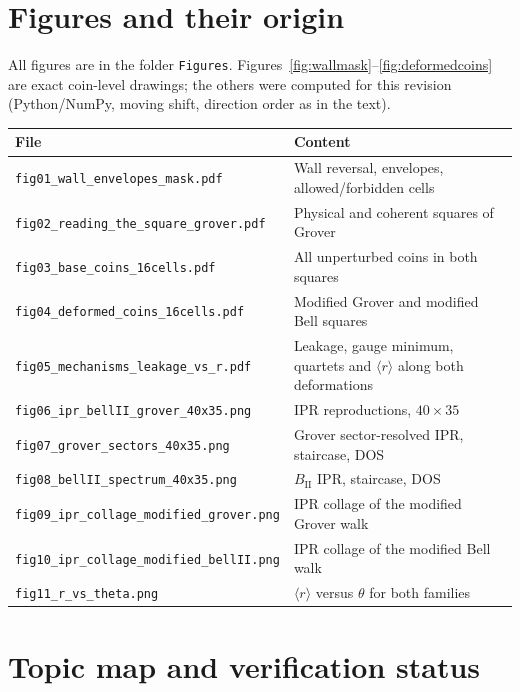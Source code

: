 \documentclass[11pt,a4paper,oneside]{report}
\numberwithin{equation}{chapter}
\begin{document}
\section{Figures and their origin}
All figures are in the folder \texttt{Figures}. Figures~\ref{fig:wallmask}--\ref{fig:deformedcoins}
are exact coin-level drawings; the others were computed for this revision (Python/NumPy,
moving shift, direction order as in the text).
\begin{center}\small
\begin{tabularx}{\textwidth}{@{}lY@{}}\toprule
File & Content\\\midrule
\texttt{fig01\_wall\_envelopes\_mask.pdf} & Wall reversal, envelopes, allowed/forbidden cells\\
\texttt{fig02\_reading\_the\_square\_grover.pdf} & Physical and coherent squares of Grover\\
\texttt{fig03\_base\_coins\_16cells.pdf} & All unperturbed coins in both squares\\
\texttt{fig04\_deformed\_coins\_16cells.pdf} & Modified Grover and modified Bell squares\\
\texttt{fig05\_mechanisms\_leakage\_vs\_r.pdf} & Leakage, gauge minimum, quartets and \(\langle r\rangle\) along both deformations\\
\texttt{fig06\_ipr\_bellII\_grover\_40x35.png} & IPR reproductions, \(40\times35\)\\
\texttt{fig07\_grover\_sectors\_40x35.png} & Grover sector-resolved IPR, staircase, DOS\\
\texttt{fig08\_bellII\_spectrum\_40x35.png} & \(B_{\mathrm{II}}\) IPR, staircase, DOS\\
\texttt{fig09\_ipr\_collage\_modified\_grover.png} & IPR collage of the modified Grover walk\\
\texttt{fig10\_ipr\_collage\_modified\_bellII.png} & IPR collage of the modified Bell walk\\
\texttt{fig11\_r\_vs\_theta.png} & \(\langle r\rangle\) versus \(\theta\) for both families\\\bottomrule
\end{tabularx}
\end{center}

\section{Topic map and verification status}
\end{document}
